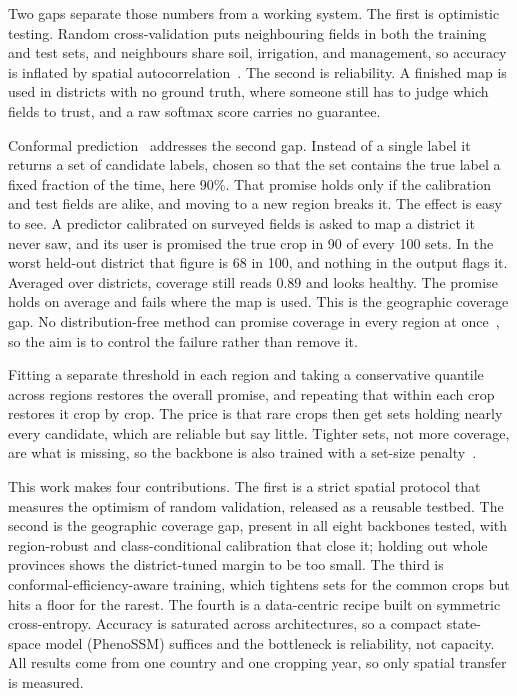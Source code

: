 \documentclass[conference]{IEEEtran}
\begin{document}
Two gaps separate those numbers from a working system. The first is optimistic
testing. Random cross-validation puts neighbouring fields in both the training and
test sets, and neighbours share soil, irrigation, and management, so accuracy is
inflated by spatial
autocorrelation~\cite{roberts2017cv,meyer2019spatialcv,ploton2020spatial}. The second
is reliability. A finished map is used in districts with no ground truth, where
someone still has to judge which fields to trust, and a raw softmax score carries no
guarantee.

Conformal prediction~\cite{vovk2005algorithmic,angelopoulos2023conformal} addresses
the second gap. Instead of a single label it returns a set of candidate labels, chosen
so that the set contains the true label a fixed fraction of the time, here 90\%. That
promise holds only if the calibration and test fields are alike, and moving to a new
region breaks it. The effect is easy to see. A predictor calibrated on surveyed fields
is asked to map a district it never saw, and its user is promised the true crop in 90
of every 100 sets. In the worst held-out district that figure is 68 in 100, and
nothing in the output flags it. Averaged over districts, coverage still reads 0.89 and
looks healthy. The promise holds on average and fails where the map is used. This is
the geographic coverage gap. No distribution-free method can promise coverage in every
region at once~\cite{barber2023nonexchangeable}, so the aim is to control the failure
rather than remove it.

Fitting a separate threshold in each region and taking a conservative quantile across
regions restores the overall promise, and repeating that within each crop restores it
crop by crop. The price is that rare crops then get sets holding nearly every
candidate, which are reliable but say little. Tighter sets, not more coverage, are
what is missing, so the backbone is also trained with a set-size
penalty~\cite{stutz2022conformal}.

This work makes four contributions. The first is a strict spatial protocol that
measures the optimism of random validation, released as a reusable testbed. The
second is the geographic coverage gap, present in all eight backbones tested, with
region-robust and class-conditional calibration that close it; holding out whole
provinces shows the district-tuned margin to be too small. The third is
conformal-efficiency-aware training, which tightens sets for the common crops but
hits a floor for the rarest. The fourth is a data-centric recipe built on symmetric
cross-entropy. Accuracy is saturated across architectures, so a compact state-space
model (PhenoSSM) suffices and the bottleneck is reliability, not capacity. All results
come from one country and one cropping year, so only spatial transfer is measured.
\end{document}
